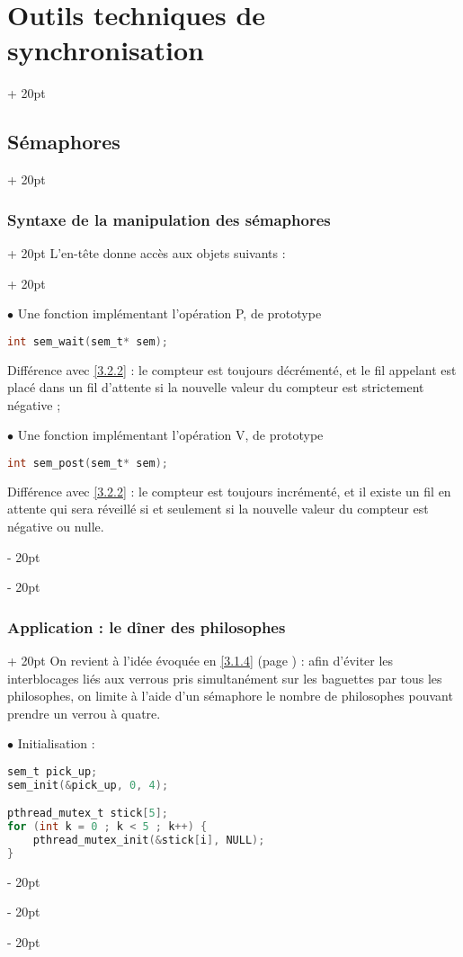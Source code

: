 \documentclass[a4paper, 12pt, twoside]{article}
\newcommand{\ind}[1][20pt]{\advance\leftskip + #1}
\newcommand{\deind}[1][20pt]{\advance\leftskip - #1}
\newenvironment{indt}[2][20pt]{#2 \par \ind[#1]}{\par \deind} %
\begin{document}
\begin{indt}{\section{Outils techniques de synchronisation}}
\begin{indt}{\subsection{Sémaphores}}
\begin{indt}{\subsubsection{Syntaxe de la manipulation  des sémaphores}}
\begin{indt}{L'en-tête donne accès aux objets suivants :}
                    \vspace{6pt}
                    
                    $\bullet$ Une fonction implémentant l'opération P, de prototype
                    \begin{lstlisting}[language=C, xleftmargin=100pt]
int sem_wait(sem_t* sem);\end{lstlisting}
                    Différence avec \ref{3.2.2} : le compteur est toujours décrémenté, et le fil appelant est placé dans un fil d'attente si la nouvelle valeur du compteur est strictement négative ;

                    \vspace{6pt}
                    
                    $\bullet$ Une fonction implémentant l'opération V, de prototype
                    \begin{lstlisting}[language=C, xleftmargin=100pt]
int sem_post(sem_t* sem);\end{lstlisting}
                    Différence avec \ref{3.2.2} : le compteur est toujours incrémenté, et il existe un fil en attente qui sera réveillé si et seulement si la nouvelle valeur du compteur est négative ou nulle.
                \end{indt}
            \end{indt}

            \vspace{12pt}
            
            \begin{indt}{\subsubsection{Application : le dîner des philosophes}}
                On revient à l'idée évoquée en \ref{3.1.4} (page \pageref{3.1.4}) : afin d'éviter les interblocages liés aux verrous pris simultanément sur les baguettes par tous les philosophes, on limite à l'aide d'un sémaphore le nombre de philosophes pouvant prendre un verrou à quatre.

                \vspace{12pt}
                
                $\bullet$ Initialisation :

                \begin{lstlisting}[language=C, xleftmargin=80pt]
sem_t pick_up;
sem_init(&pick_up, 0, 4);

pthread_mutex_t stick[5];
for (int k = 0 ; k < 5 ; k++) {
    pthread_mutex_init(&stick[i], NULL);
}\end{lstlisting}


\end{indt}
\end{indt}
\end{indt}
\end{document}
